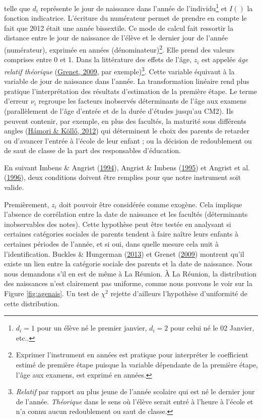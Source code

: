 \documentclass[
]{book}
\begin{document}
telle que \(d_{i}\) représente le jour de naissance dans l'année de l'individu\footnote{\(d_i = 1\) pour un élève né le premier janvier, \(d_i = 2\) pour celui né le 02 Janvier, etc..} et \(I()\) la fonction indicatrice. L'écriture du numérateur permet de prendre en compte le fait que 2012 était une année bissextile. Ce mode de calcul fait ressortir la distance entre le jour de naissance de l'élève et le dernier jour de l'année (numérateur), exprimée en années (dénominateur)\footnote{Exprimer l'instrument en années est pratique pour interpréter le coefficient estimé de première étape puisque la variable dépendante de la première étape, l'âge aux examens, est exprimé en années.}. Elle prend des valeurs comprises entre 0 et 1. Dans la littérature des effets de l'âge, \(z_{i}\) est appelée \emph{âge relatif théorique} (\protect\hyperlink{ref-GRE:09}{Grenet, 2009}, par exemple)\footnote{\emph{Relatif} par rapport au plus jeune de l'année scolaire qui est né le dernier jour de l'année. \emph{Théorique} dans le sens où l'élève serait entré à l'heure à l'école et n'a connu aucun redoublement ou saut de classe.}. Cette variable équivaut à la variable de jour de naissance dans l'année. La transformation linéaire rend plus pratique l'interprétation des résultats d'estimation de la première étape. Le terme d'erreur \(\nu_{i}\) regroupe les facteurs inobservés déterminants de l'âge aux examens (parallèlement de l'âge d'entrée et de la durée d'études jusqu'au CM2). Ils peuvent contenir, par exemple, en plus des facultés, la maturité sous différents angles (\protect\hyperlink{ref-HAM:KOL:12}{Hámori \& Köllő, 2012}) qui déterminent le choix des parents de retarder ou d'avancer l'entrée à l'école de leur enfant ; ou la décision de redoublement ou de saut de classe de la part des responsables d'éducation.

\quad En suivant Imbens \& Angrist (\protect\hyperlink{ref-IMB:ANG:94}{1994}), Angrist \& Imbens (\protect\hyperlink{ref-ANG:IMB:95}{1995}) et Angrist et al. (\protect\hyperlink{ref-ANG:eal:96}{1996}), deux conditions doivent être remplies pour que notre instrument soit valide.

\quad Premièrement, \(z_i\) doit pouvoir être considérée comme exogène. Cela implique l'absence de corrélation entre la date de naissance et les facultés (déterminants inobservables des notes). Cette hypothèse peut être testée en analysant si certaines catégories sociales de parents tendent à faire naître leurs enfants à certaines périodes de l'année, et si oui, dans quelle mesure cela nuit à l'identification. Buckles \& Hungerman (\protect\hyperlink{ref-BUC:HUN:13}{2013}) et Grenet (\protect\hyperlink{ref-GRE:09}{2009}) montrent qu'il existe un lien entre la catégorie sociale des parents et la date de naissance. Nous nous demandons s'il en est de même à La Réunion. À La Réunion, la distribution des naissances n'est clairement pas uniforme, comme nous pouvons le voir sur la Figure \ref{fig:agenais}. Un test de \(\chi^2\) rejette d'ailleurs l'hypothèse d'uniformité de cette distribution.
\end{document}

